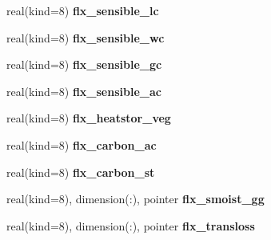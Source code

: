 \begin{DoxyCompactItemize}
\item 
\hypertarget{structrk4__coms_1_1rk4patchtype_a91231e44502f9d26fe8950c128fbf3b4}{
real(kind=8) {\bfseries flx\_\-sensible\_\-lc}}
\label{structrk4__coms_1_1rk4patchtype_a91231e44502f9d26fe8950c128fbf3b4}

\item 
\hypertarget{structrk4__coms_1_1rk4patchtype_a9a2066494f7de002d7e86be57a903d06}{
real(kind=8) {\bfseries flx\_\-sensible\_\-wc}}
\label{structrk4__coms_1_1rk4patchtype_a9a2066494f7de002d7e86be57a903d06}

\item 
\hypertarget{structrk4__coms_1_1rk4patchtype_a878de75c1a4fa1dd80bbdda3f7320b6a}{
real(kind=8) {\bfseries flx\_\-sensible\_\-gc}}
\label{structrk4__coms_1_1rk4patchtype_a878de75c1a4fa1dd80bbdda3f7320b6a}

\item 
\hypertarget{structrk4__coms_1_1rk4patchtype_ac4ba0b1904aeb8cb29dc5fd2faff693f}{
real(kind=8) {\bfseries flx\_\-sensible\_\-ac}}
\label{structrk4__coms_1_1rk4patchtype_ac4ba0b1904aeb8cb29dc5fd2faff693f}

\item 
\hypertarget{structrk4__coms_1_1rk4patchtype_acda7fd7edfd45e19f5019eb3d3a876c7}{
real(kind=8) {\bfseries flx\_\-heatstor\_\-veg}}
\label{structrk4__coms_1_1rk4patchtype_acda7fd7edfd45e19f5019eb3d3a876c7}

\item 
\hypertarget{structrk4__coms_1_1rk4patchtype_ac17d65cfb6aba2b49aa0111ebd481ff8}{
real(kind=8) {\bfseries flx\_\-carbon\_\-ac}}
\label{structrk4__coms_1_1rk4patchtype_ac17d65cfb6aba2b49aa0111ebd481ff8}

\item 
\hypertarget{structrk4__coms_1_1rk4patchtype_aaac4b941f5219cb09fcee913df1fe758}{
real(kind=8) {\bfseries flx\_\-carbon\_\-st}}
\label{structrk4__coms_1_1rk4patchtype_aaac4b941f5219cb09fcee913df1fe758}

\item 
\hypertarget{structrk4__coms_1_1rk4patchtype_a5ac6e0e292e341aeaf1a41d32f191bd9}{
real(kind=8), dimension(:), pointer {\bfseries flx\_\-smoist\_\-gg}}
\label{structrk4__coms_1_1rk4patchtype_a5ac6e0e292e341aeaf1a41d32f191bd9}

\item 
\hypertarget{structrk4__coms_1_1rk4patchtype_a9cf5d0e38fc85fb32e0061e7be082b31}{
real(kind=8), dimension(:), pointer {\bfseries flx\_\-transloss}}
\label{structrk4__coms_1_1rk4patchtype_a9cf5d0e38fc85fb32e0061e7be082b31}


\end{DoxyCompactItemize}
